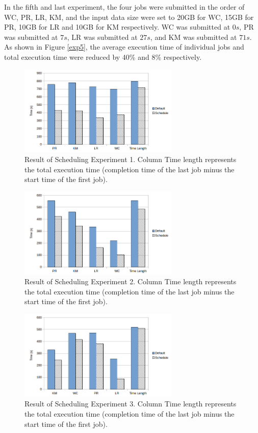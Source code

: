\noindent
In the fifth and last experiment, the four jobs were submitted in the order of WC, PR, LR, KM, and the input data size were set to 20GB for WC, 15GB for PR, 10GB for LR and 10GB for KM respectively. WC was submitted at $0s$, PR was submitted at $7s$, LR was submitted at $27s$, and KM was submitted at $71s$. As shown in Figure \ref{exp5}, the average execution time of individual jobs and total execution time were reduced by 40\% and 8\% respectively. 


\begin{figure}[!t]
\centering
\captionsetup{justification=centering}
\includegraphics[width=3in]{exp1.png}
\caption{Result of Scheduling Experiment 1. Column Time length represents the total execution time (completion time of the last job minus the start time of the first job).}
\label{exp1}
\end{figure}

\begin{figure}[!t]
\centering
\captionsetup{justification=centering}
\includegraphics[width=3in]{exp2.png}
\caption{Result of Scheduling Experiment 2. Column Time length represents the total execution time (completion time of the last job minus the start time of the first job).}
\label{exp2}
\end{figure}

\begin{figure}[!t]
\centering
\captionsetup{justification=centering}
\includegraphics[width=3in]{exp3.png}
\caption{Result of Scheduling Experiment 3. Column Time length represents the total execution time (completion time of the last job minus the start time of the first job).}
\label{exp3}
\end{figure}



